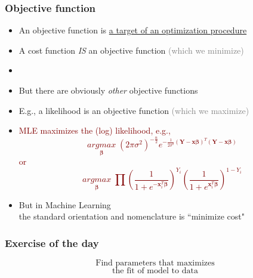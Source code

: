 \documentclass[xcolor={dvipsnames}]{beamer}
\begin{document}
\frame
{
\normalsize
\frametitle{Objective function}

\begin{itemize}
\item An objective function is \underline{a target of an optimization procedure}
\item A cost function \emph{IS} an objective function \textcolor{gray}{(which we minimize)}
\item[]
\item<2-> But there are obviously \emph{other} objective functions
\item<2-> E.g., a likelihood is an objective function \textcolor{gray}{(which we maximize)}
\item<3-> \textcolor{Maroon}{MLE maximizes the (log) likelihood, e.g.,
$$\underset{{\boldsymbol\beta}}{argmax}\; (2\pi \sigma^2)^{-\frac{n}{2}} e^{-\frac{1}{2\sigma^2}(\textbf{Y} - \textbf{x}{\boldsymbol\beta})^T(\textbf{Y} - \textbf{x}{\boldsymbol\beta})}$$
or
$$\underset{{\boldsymbol\beta}}{argmax}\; \prod \left(\frac{1}{1+e^{-\textbf{x}_i^T\boldsymbol\beta }}\right)^{Y_i} \left(\frac{1}{1+e^{\textbf{x}_i^T\boldsymbol\beta}}\right)^{1-Y_i}$$}
\item<4-> But in Machine Learning \\
the standard orientation and nomenclature
is ``minimize cost"
\end{itemize}

}

\frame
{
\normalsize
\frametitle{Exercise of the day}

\huge
\vspace{-2em}
$$\text{Find parameters that maximizes}$$
\vspace{-2em}
$$\text{the fit of model to data}$$
\vspace{-1em}
\vspace{-1em}
}
\end{document}
